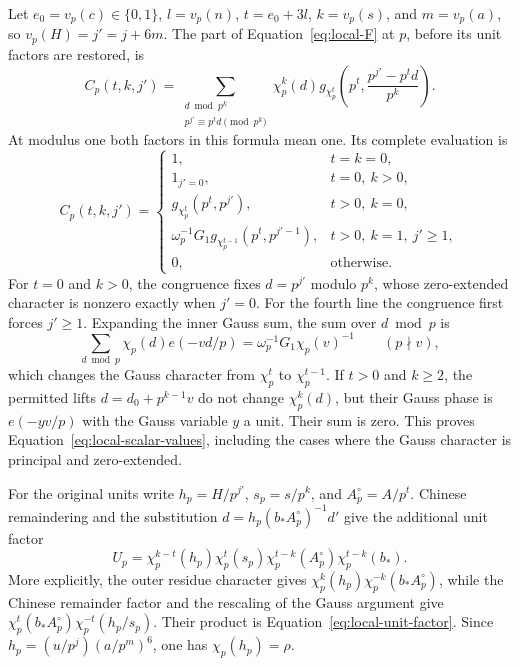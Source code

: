 \documentclass[11pt,a4paper]{article}
\numberwithin{equation}{section}
\numberwithin{figure}{section}
\theoremstyle{definition}
\theoremstyle{remark}
\begin{document}
Let $e_0=v_p(c)\in\{0,1\}$, $l=v_p(n)$, $t=e_0+3l$,
$k=v_p(s)$, and $m=v_p(a)$, so $v_p(H)=j'=j+6m$.
The part of Equation~\eqref{eq:local-F} at $p$, before its unit
factors are restored, is
\begin{equation}\label{eq:local-scalar-definition}
 C_p(t,k,j')=
 \sum_{\substack{d\bmod p^k\\p^{j'}\equiv p^td\pmod{p^k}}}
 \chi_p^k(d)
 g_{\chi_p^t}\!\left(p^t,\frac{p^{j'}-p^td}{p^k}\right).
\end{equation}
At modulus one both factors in this formula mean one.  Its complete
evaluation is
\begin{equation}\label{eq:local-scalar-values}
 C_p(t,k,j')=
 \begin{cases}
 1,&t=k=0,\\
 1_{j'=0},&t=0,\ k>0,\\
 g_{\chi_p^t}(p^t,p^{j'}),&t>0,\ k=0,\\
 \omega_p^{-1}G_1g_{\chi_p^{t-1}}(p^t,p^{j'-1}),
                      &t>0,\ k=1,\ j'\ge1,\\
 0,&\text{otherwise}.
 \end{cases}
\end{equation}
For $t=0$ and $k>0$, the congruence fixes $d=p^{j'}$ modulo
$p^k$, whose zero-extended character is nonzero exactly when
$j'=0$.  For the fourth line the congruence first forces $j'\ge1$.
Expanding the inner Gauss sum, the sum over $d\bmod p$ is
\[
 \sum_{d\bmod p}\chi_p(d)e(-vd/p)
       =\omega_p^{-1}G_1\chi_p(v)^{-1}
       \qquad(p\nmid v),
\]
which changes the Gauss character from $\chi_p^t$ to
$\chi_p^{t-1}$.  If $t>0$ and $k\ge2$, the permitted lifts
$d=d_0+p^{k-1}v$ do not change $\chi_p^k(d)$, but their Gauss phase
is $e(-yv/p)$ with the Gauss variable $y$ a unit.  Their sum is
zero.  This proves Equation~\eqref{eq:local-scalar-values}, including
the cases where the Gauss character is principal and zero-extended.

For the original units write $h_p=H/p^{j'}$, $s_p=s/p^k$, and
$A_p^\circ=A/p^t$.  Chinese remaindering and the substitution
$d=h_p(b_*A_p^\circ)^{-1}d'$ give the additional unit factor
\begin{equation}\label{eq:local-unit-factor}
 U_p=\chi_p^{k-t}(h_p)\chi_p^t(s_p)
       \chi_p^{t-k}(A_p^\circ)\chi_p^{t-k}(b_*).
\end{equation}
More explicitly, the outer residue character gives
$\chi_p^k(h_p)\chi_p^{-k}(b_*A_p^\circ)$, while the Chinese
remainder factor and the rescaling of the Gauss argument give
$\chi_p^t(b_*A_p^\circ)\chi_p^{-t}(h_p/s_p)$.  Their product is
Equation~\eqref{eq:local-unit-factor}.  Since
$h_p=(u/p^j)(a/p^m)^6$, one has $\chi_p(h_p)=\rho$.
\end{document}
